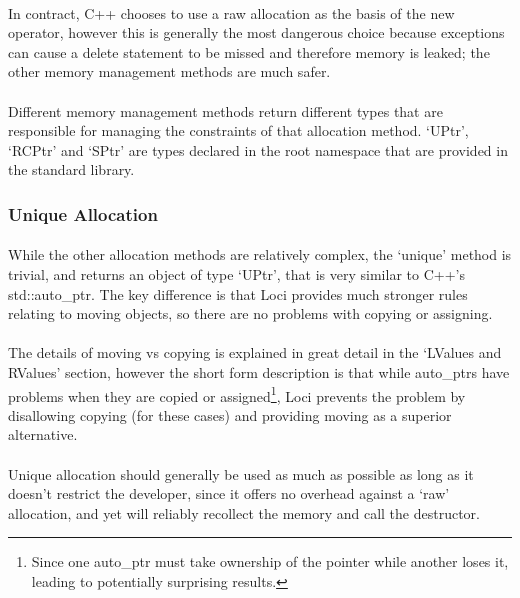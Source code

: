 \documentclass[12pt,twoside,notitlepage]{report}
\begin{document}
\paragraph{}
In contract, C++ chooses to use a raw allocation as the basis of the new operator, however this is generally the most dangerous choice because exceptions can cause a delete statement to be missed and therefore memory is leaked; the other memory management methods are much safer.

\paragraph{}
Different memory management methods return different types that are responsible for managing the constraints of that allocation method. `UPtr', `RCPtr' and `SPtr' are types declared in the root namespace that are provided in the standard library.

\subsubsection{Unique Allocation}

\paragraph{}
While the other allocation methods are relatively complex, the `unique' method is trivial, and returns an object of type `UPtr', that is very similar to C++'s std::auto\_ptr. The key difference is that Loci provides much stronger rules relating to moving objects, so there are no problems with copying or assigning.

\paragraph{}
The details of moving vs copying is explained in great detail in the `LValues and RValues' section, however the short form description is that while auto\_ptrs have problems when they are copied or assigned\footnote{Since one auto\_ptr must take ownership of the pointer while another loses it, leading to potentially surprising results.}, Loci prevents the problem by disallowing copying (for these cases) and providing moving as a superior alternative.

\paragraph{}
Unique allocation should generally be used as much as possible as long as it doesn't restrict the developer, since it offers no overhead against a `raw' allocation, and yet will reliably recollect the memory and call the destructor.
\end{document}
